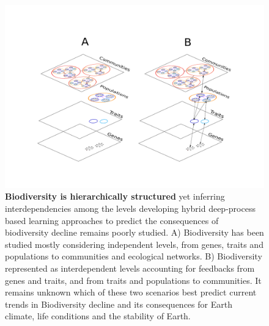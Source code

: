 \documentclass[authoryear,1p,12pt]{elsarticle}
\begin{document}
\begin{figure}[htp]
  \centering
  \includegraphics[height=0.018\maxdimen, width=\textwidth]{Figure2}
	\caption{
  \small{\textbf{Biodiversity is hierarchically
         structured} yet inferring interdependencies among the levels
       developing hybrid deep-process based learning approaches to
       predict the consequences of biodiversity decline remains poorly
       studied. A) Biodiversity has been studied mostly considering
       independent levels, from genes, traits and populations to
       communities and ecological networks. B) Biodiversity
       represented as interdependent levels accounting for feedbacks
       from genes and traits, and from traits and populations to
       communities. It remains unknown which of these two scenarios
       best predict current trends in Biodiversity decline and its
       consequences for Earth climate, life conditions and the
       stability of Earth.}
		}
	\label{fig:2}
\end{figure}
\end{document}
